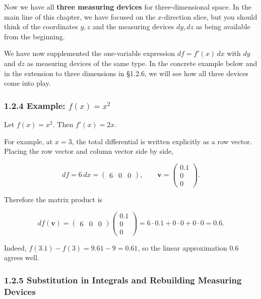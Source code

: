 Now we have all \textbf{three measuring devices} for three-dimensional
space. In the main line of this chapter, we have focused on the
\(x\)-direction slice, but you should think of the coordinates \(y,z\)
and the measuring devices \(dy,dz\) as being available from the
beginning.

We have now supplemented the one-variable expression \(df=f'(x)\,dx\)
with \(dy\) and \(dz\) as measuring devices of the same type. In the
concrete example below and in the extension to three dimensions in
§1.2.6, we will see how all three devices come into play.

\hypertarget{example-fxx2}{%
\subsubsection{\texorpdfstring{1.2.4 Example:
\(f(x)=x^2\)}{1.2.4 Example: f(x)=x\^{}2}}\label{example-fxx2}}

Let \(f(x)=x^2\). Then \(f'(x)=2x\).

For example, at \(x=3\), the total differential is written explicitly as
a row vector. Placing the row vector and column vector side by side,

\[
df=6\,dx=\begin{pmatrix}6&0&0\end{pmatrix},\qquad
\mathbf{v}=\begin{pmatrix}0.1\\0\\0\end{pmatrix}.
\]

Therefore the matrix product is

\[
df(\mathbf{v})=
\begin{pmatrix}6&0&0\end{pmatrix}
\begin{pmatrix}0.1\\0\\0\end{pmatrix}
=6\cdot0.1+0\cdot0+0\cdot0=0.6.
\]

Indeed, \(f(3.1)-f(3)=9.61-9=0.61\), so the linear approximation \(0.6\)
agrees well.

\hypertarget{substitution-in-integrals-and-rebuilding-measuring-devices}{%
\subsubsection{1.2.5 Substitution in Integrals and Rebuilding Measuring
Devices}\label{substitution-in-integrals-and-rebuilding-measuring-devices}}

